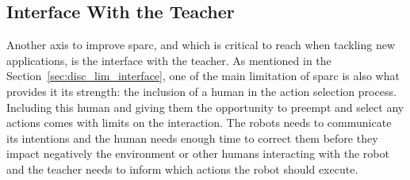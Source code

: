 
\subsection{Interface With the Teacher}
Another axis to improve \gls{sparc}, and which is critical to reach when tackling new applications, is the interface with the teacher. As mentioned in the Section~\ref{sec:disc_lim_interface}, one of the main limitation of \gls{sparc} is also what provides it its strength: the inclusion of a human in the action selection process. Including this human and giving them the opportunity to preempt and select any actions comes with limits on the interaction. The robots needs to communicate its intentions and the human needs enough time to correct them before they impact negatively the environment or other humans interacting with the robot and the teacher needs to inform which actions the robot should execute. %

